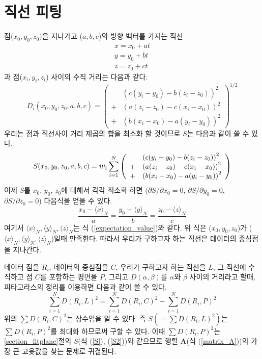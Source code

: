 \documentclass[chapter,a4paper,10pt]{oblivoir}
\begin{document}
\section{직선 피팅}
점($x_0, y_0, z_0$)을 지나가고 ($a,b,c$)의 방향 벡터를 가지는 직선
\begin{equation}
\left.
\begin{array}{ll}
x = x_0 + at \\\nonumber
y = y_0 + bt \\\nonumber
z = z_0 + ct
\end{array}\right.
\end{equation}
과 점($x_i, y_i, z_i$) 사이의 수직 거리는 다음과 같다.
\begin{equation}
D_i(x_0,y_0,z_0,a,b,c) = \left(
\begin{array}{ll}
  &\left(c(y_i-y_0) - b(z_i - z_0)\right)^2 \\
  + &\left(a(z_i-z_0) - c(x_i - x_0)\right)^2 \\
  + &\left(b(x_i-x_0) - a(y_i - y_0)\right)^2
\end{array} \right)^{1/2}
\end{equation}
우리는 점과 직선사이 거리 제곱의 합을 최소화 할 것이므로 $S$는 다음과 같이 쓸 수 있다.
\begin{equation}
S(x_0,y_0,z_0,a,b,c) = \mathlarger w_i \sum_{i=1}^N\left(
\begin{array}{ll}
  &\left(c(y_i-y_0) - b(z_i - z_0)\right)^2 \\
  + &\left(a(z_i-z_0) - c(x_i - x_0)\right)^2 \\
  + &\left(b(x_i-x_0) - a(y_i - y_0)\right)^2
\end{array} \right)
\end{equation}
이제 $S$를 $x_0$, $y_0$, $z_0$에 대해서 각각 최소화 하면
(${\partial S}/{\partial x_0}=0$, ${\partial S}/{\partial y_0}=0$, ${\partial S}/{\partial z_0}=0$)
다음식을 얻을 수 있다.
\begin{equation}
\frac{x_0-\langle x \rangle_N}{a} = \frac{y_0-\langle y \rangle_N}{b} = \frac{z_0-\langle z \rangle_N}{c}
\end{equation}
여기서 $\langle x \rangle_N , \langle y \rangle_N, \langle z \rangle_N$는 식 (\ref{expectation_value})와 같다.
위 식은 ($x_0,y_0,z_0$)가 ($\langle x \rangle_N,\langle y \rangle_N,\langle z \rangle_N$)일때 만족한다.
따라서 우리가 구하고자 하는 직선은 데이터의 중심점을 지나간다.

데이터 점을 $R_i$, 데이터의 중심점을 $C$, 우리가 구하고자 하는 직선을 $L$,
그 직선에 수직하고 점 $C$를 포함하는 평면을 $P$, 그리고
$D(\alpha, \beta)$를 $\alpha$와 $\beta$ 사이의 거리라고 할때,
피타고라스의 정리를 이용하면 다음과 같이 쓸 수 있다.
\begin{equation}
\sum_{i=1}^N D(R_i, L)^2 = \sum_{i=1}^N D(R_i, C)^2 - \sum_{i=1}^N D(R_i, P)^2
\end{equation}
위의 $\sum D(R_i, C)^2$는 상수임을 알 수 있다.
즉 $S(=\sum D(R_i, L)^2)$는
$\sum D(R_i, P)^2$를 최대화 하므로써 구할 수 있다.
이때 $\sum D(R_i, P)^2$는 \ref{section_fitplane}절의 $S$(식 (\ref{S}), (\ref{S2}))와 같으므로
행렬 $\mathbf{A}$(식 (\ref{matrix_A}))의 가장 큰 고윳값을 찾는 문제로 귀결된다.
\end{document}
